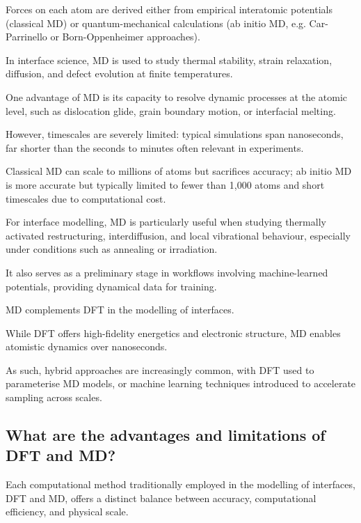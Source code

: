 Forces on each atom are derived either from empirical interatomic potentials (classical MD) or quantum-mechanical
calculations (ab initio MD, e.g. Car-Parrinello or Born-Oppenheimer approaches).

In interface science, MD is used to study thermal stability, strain relaxation, diffusion, and defect evolution at
finite temperatures.


One advantage of MD is its capacity to resolve dynamic processes at the atomic level, such as dislocation glide, grain
boundary motion, or interfacial melting.

However, timescales are severely limited: typical simulations span nanoseconds, far shorter than the seconds to minutes
often relevant in experiments.

Classical MD can scale to millions of atoms but sacrifices accuracy; ab initio MD is more accurate but typically limited
to fewer than 1,000 atoms and short timescales due to computational cost.


For interface modelling, MD is particularly useful when studying thermally activated restructuring, interdiffusion, and
local vibrational behaviour, especially under conditions such as annealing or irradiation.

It also serves as a preliminary stage in workflows involving machine-learned potentials, providing dynamical data for
training.


MD complements DFT in the modelling of interfaces.

While DFT offers high-fidelity energetics and electronic structure, MD enables atomistic dynamics over nanoseconds.

As such, hybrid approaches are increasingly common, with DFT used to parameterise MD models, or machine learning
techniques introduced to accelerate sampling across scales.


\subsection{What are the advantages and limitations of DFT and MD?}


Each computational method traditionally employed in the modelling of interfaces, DFT and MD, offers a distinct balance
between accuracy, computational efficiency, and physical scale.

